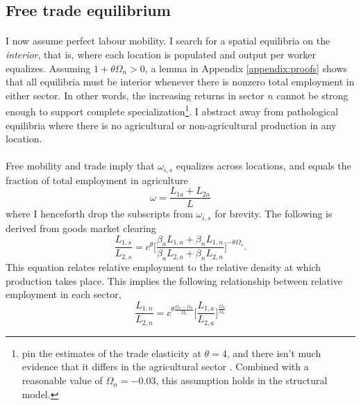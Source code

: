 \documentclass[]{article}
\theoremstyle{plain}
\begin{document}
\subsection*{Free trade equilibrium} 
\paragraph*{}
I now assume perfect labour mobility. I search for a spatial equilibria on the \textit{interior}, that is, where each location is populated and output per worker equalizes.  Assuming $1 + \theta\Omega_{n} > 0$, a lemma in Appendix \ref{appendix:proofs} shows that all equilibria must be interior whenever there is nonzero total employment in either sector. In other words, the increasing returns in sector $n$ cannot be strong enough to support complete specialization\footnote{\citet{sw2014} pin the estimates of the trade elasticity at $\theta = 4$, and there isn't much evidence that it differs in the agricultural sector \citep{tombe2015}. Combined with a reasonable value of $\Omega_{n} = -0.03$, this assumption holds in the structural model.}. I abstract away from pathological equilibria where there is no agricultural or non-agricultural production in any location.
\paragraph*{}
Free mobility and trade imply that $\omega_{i, s}$ equalizes across locations, and equals the fraction of total employment in agriculture
\begin{equation}\label{employmentag}
	\omega = \frac{L_{1a} + L_{2a}}{L}
\end{equation}
where I henceforth drop the subscripts from $\omega_{i, s}$ for brevity. The following is derived from goods market clearing
\begin{equation}\label{densityclear}
	\frac{L_{1, s}}{L_{2, s}} = c^{\theta}\bigg[\frac{\beta_{a}L_{1, a} + \beta_{n}L_{1, n}}{\beta_{a}L_{2, a} + \beta_{n}L_{2, n}}\bigg]^{-\theta\Omega_{s}}.
\end{equation}
This equation relates relative employment to the relative density at which production takes place. This implies the following relationship between relative employment in each sector, 
\begin{equation} \label{spec}
	\frac{L_{1,n}}{L_{2, n}} = c^{\theta\frac{\Omega_{a} - \Omega_{n}}{\Omega_{a}}}\bigg[\frac{L_{1,a}}{L_{2,a}}\bigg]^{\frac{\Omega_{n}}{\Omega_{a}}}
\end{equation}
\end{document}
